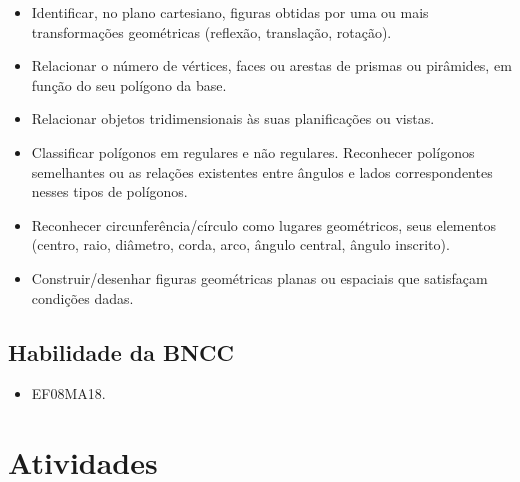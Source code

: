 {{\begin{itemize}
\item Identificar, no plano cartesiano, figuras obtidas
por uma ou mais transformações geométricas (reflexão, translação,
rotação).
\item
  Relacionar o número de vértices, faces ou arestas de prismas ou
  pirâmides, em função do seu polígono da base.
\item
  Relacionar objetos tridimensionais às suas planificações ou vistas.
\item
  Classificar polígonos em regulares e não regulares. Reconhecer
  polígonos semelhantes ou as relações existentes entre ângulos e lados
  correspondentes nesses tipos de polígonos.
\item
  Reconhecer circunferência/círculo como lugares geométricos, seus
  elementos (centro, raio, diâmetro, corda, arco, ângulo central, ângulo
  inscrito).
\item
  Construir/desenhar figuras geométricas planas ou espaciais que
  satisfaçam condições dadas.
\end{itemize}

\subsection{Habilidade da BNCC}

\begin{itemize}
\item EF08MA18.
\end{itemize}



\section*{Atividades}



}}
